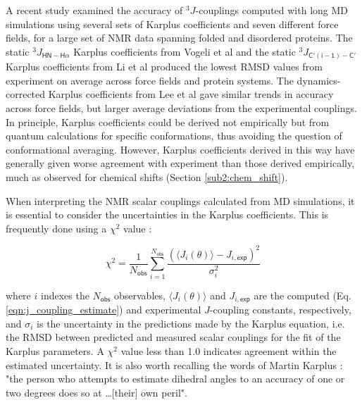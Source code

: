 \documentclass[9pt,review]{livecoms}
\begin{document}
A recent study \cite{robustelli_developing_2018} examined the accuracy of $^3J$-couplings computed with long MD simulations using several sets of Karplus coefficients and seven different force fields, for a large set of NMR data spanning folded and disordered proteins. The static $^3J_{\mathsf{HN-H\alpha}}$ Karplus coefficients from Vogeli et al \cite{vogeli_limits_2007} and the static $^3J_{\mathsf{C'(i-1)-C'}}$ Karplus coefficients from Li et al \cite{li_high_2015} produced the lowest RMSD values from experiment on average across force fields and protein systems.
The dynamics-corrected Karplus coefficients from Lee et al \cite{lee_quantitative_2015} gave similar trends in accuracy across force fields, but larger average deviations from the experimental couplings.
In principle, Karplus coefficients could be derived not empirically but from quantum calculations for specific conformations, thus avoiding the question of conformational averaging.
However, Karplus coefficients derived in this way have generally given worse agreement with experiment than those derived empirically\cite{brueschweiler_adding_1994,case_static_2000,chou_insights_2003,lindorff-larsen_interpreting_2005,vogeli_limits_2007,lee_quantitative_2015}, much as observed for chemical shifts (Section \ref{sub2:chem_shift}).

When interpreting the NMR scalar couplings calculated from MD simulations, it is essential to consider the uncertainties in the Karplus coefficients.
This is frequently done using a $\chi^2$ value \cite{best_balanced_2014,robustelli_developing_2018}:

\begin{equation}
\label{eqn:chi_sq}
\chi^2 = \frac {1} {N_{\mathsf{obs}}} \sum_{i=1}^{N_{\mathsf{obs}}} \frac {\left( \langle J_i(\theta) \rangle - J_{i,\mathsf{exp}} \right)^2} {\sigma_i^2}
\end{equation}

\noindent where $i$ indexes the $N_{\mathsf{obs}}$ observables, $\langle J_i(\theta) \rangle$ and $J_{i,\mathsf{exp}}$ are the computed (Eq. \ref{eqn:j_coupling_estimate}) and experimental $J$-coupling constants, respectively, and $\sigma_i$ is the uncertainty in the predictions made by the Karplus equation, i.e. the RMSD between predicted and measured scalar couplings for the fit of the Karplus parameters. A $\chi^2$ value less than 1.0 indicates agreement within the estimated uncertainty. It is also worth recalling the words of Martin Karplus \cite{karplus_vicinal_1963}: "the person who attempts to estimate dihedral angles to an accuracy of one or two degrees does so at \ldots [their] own peril".
\end{document}
